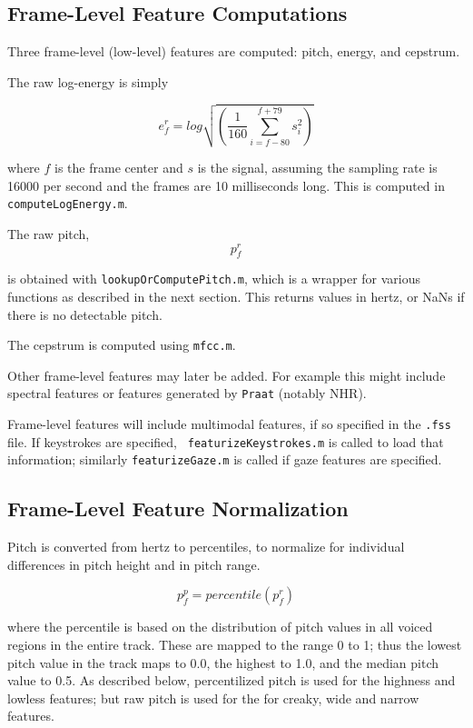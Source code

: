 \documentclass[11pt]{article}
\begin{document}
\subsection{Frame-Level Feature Computations}

Three frame-level (low-level) features are computed: pitch, energy,
and cepstrum.

The raw log-energy is simply

\begin{equation}
e_f^r = log \sqrt{(\frac{1}{160} \sum\limits_{i=f-80}^{f+79} s_i^2)}
\end{equation}

where $f$ is the frame center and $s$ is the signal, assuming the
sampling rate is 16000 per second and the frames are 10 milliseconds
long.  This is computed in {\tt computeLogEnergy.m}.

The  raw pitch,
\begin{equation}
   p^r_f
\end{equation}


is obtained with {\tt lookupOrComputePitch.m}, which is a wrapper for
various functions as described in the next section.  This returns
values in hertz, or NaNs if there is no detectable pitch.

The cepstrum is computed using {\tt mfcc.m}.

Other frame-level features may later be added.  For example this might
include spectral features or features generated by {\tt Praat}
(notably NHR).

Frame-level features will include multimodal features, if so specified
in the {\tt .fss} file.  If keystrokes are specified, {\tt
  featurizeKeystrokes.m} is called to load that information; similarly
{\tt featurizeGaze.m} is called if gaze features are specified.

\subsection{Frame-Level Feature  Normalization}

Pitch is converted from hertz to percentiles, to normalize for
individual differences in pitch height and in pitch range.

\begin{equation}
p_f^p = percentile(p_f^r)
\end{equation}

where the percentile is based on the distribution of pitch values in
all voiced regions in the entire track.  These are mapped to the range
0 to 1; thus the lowest pitch value in the track maps to 0.0, the
highest to 1.0, and the median pitch value to 0.5.  As described
below, percentilized pitch is used for the highness and lowless
features; but raw pitch is used for the for creaky, wide and narrow
features.
\end{document}
